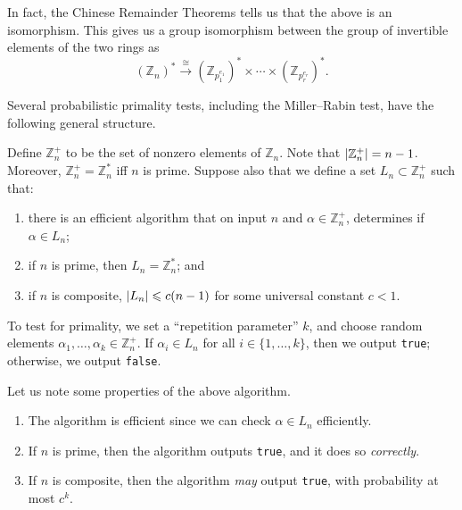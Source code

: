 \documentclass[12pt]{article}
\begin{document}
    In fact, the Chinese Remainder Theorems tells us that the above is an isomorphism. This gives us a group isomorphism between the group of invertible elements of the two rings as 
    \begin{equation} \label{eq:CRT-groups}
        (\mathbb{Z}_{n})^{\ast} \xrightarrow{\cong} (\mathbb{Z}_{p_{1}^{e_1}})^{\ast} \times \cdots \times (\mathbb{Z}_{p_{r}^{e_{r}}})^{\ast}.
    \end{equation}

    Several probabilistic primality tests, including the Miller–Rabin test, have the following general structure. \\

    \begin{blockquote}
        Define $\mathbb{Z}_{n}^{+}$ to be the set of nonzero elements of $\mathbb{Z}_{n}$. Note that ${\left\lvert \mathbb{Z}_{n}^{+} \right\lvert} = n - 1$. Moreover, $\mathbb{Z}_{n}^{+} = \mathbb{Z}_{n}^{\ast}$ iff $n$ is prime. Suppose also that we define a set $L_{n} \subset \mathbb{Z}_{n}^{+}$ such that: 
        \begin{enumerate}
            \item there is an efficient algorithm that on input $n$ and $\alpha \in \mathbb{Z}_{n}^{+}$, determines if $\alpha \in L_{n}$; 
            \item if $n$ is prime, then $L_{n} = \mathbb{Z}_{n}^{\ast}$; and 
            \item if $n$ is composite, ${\left\lvert L_{n} \right\lvert} \leqslant c(n - 1)$ for some universal constant $c < 1$.
        \end{enumerate}
    \end{blockquote}

    \begin{algo}
        To test for primality, we set a ``repetition parameter'' $k$, and choose random elements $\alpha_{1}, \ldots, \alpha_{k} \in \mathbb{Z}_{n}^{+}$. If $\alpha_{i} \in L_{n}$ for all $i \in \{1, \ldots, k\}$, then we output \texttt{true}; otherwise, we output \texttt{false}.
    \end{algo}
     
    \begin{obs}
        Let us note some properties of the above algorithm.
        \begin{enumerate}   
            \item The algorithm is efficient since we can check $\alpha \in L_{n}$ efficiently. 
            \item If $n$ is prime,  then the algorithm outputs \texttt{true},  and it does so \emph{correctly}. 
            \item If $n$ is composite,  then the algorithm \emph{may} output \texttt{true},  with probability at most $c^{k}$.
        \end{enumerate}
    \end{obs}
\end{document}

